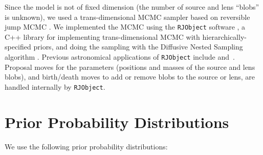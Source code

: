 \documentclass[useAMS,usenatbib]{mn2e}
\begin{document}
Since the model is not of fixed dimension (the number of source and lens
``blobs'' is unknown), we used a trans-dimensional MCMC sampler based on
reversible jump MCMC \citep{green}. We implemented the MCMC using the
{\tt RJObject} software \citep{rjobject}, a C++ library for implementing trans-dimensional
MCMC with hierarchically-specified priors, and doing the sampling with the
Diffusive Nested Sampling algorithm \citep{dnest}. Previous astronomical
applications of {\tt RJObject} include \citet{magnetron}
and~\citep{exoplanet}. Proposal moves for the parameters (positions and masses
of the source and lens blobs), and birth/death moves to add or remove blobs
to the source or lens, are handled internally by {\tt RJObject}.


\section{Prior Probability Distributions}
We use the following prior probability distributions:
\end{document}
